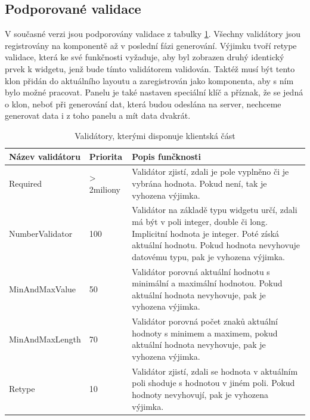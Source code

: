 \subsection{Podporované validace}
V současné verzi jsou podporovány validace z tabulky \ref{table:validations}. Všechny validátory jsou registrovány na komponentě až v poslední fázi generování. Výjimku tvoří retype validace, která ke své funkčnosti vyžaduje, aby byl zobrazen druhý identický prvek k widgetu, jenž bude tímto validátorem validován. Taktéž musí být tento klon přidán do aktuálního layoutu a zaregistrován jako komponenta, aby s ním bylo možné pracovat. Panelu je také nastaven speciální klíč a příznak, že se jedná o klon, neboť při generování dat, která budou odeslána na server, nechceme generovat data i z toho panelu a mít data dvakrát.
\begin{table}[width=\linewidth]
\begin{center}
\caption{Validátory, kterými disponuje klientská část}
\label{table:validations}
\begin{tabular}{|p{4cm}|p{2cm}|p{8cm}|}
\hline
\textbf{Název validátoru} & \textbf{Priorita} & \textbf{Popis funčknosti} \\
\hline
Required & > 2miliony & 
Validátor zjistí, zdali je pole vyplněno či je vybrána hodnota. Pokud není, tak je vyhozena výjimka. \\
\hline
NumberValidator & 100 &
Validátor na základě typu widgetu určí, zdali má být v poli integer, double či long. Implicitní hodnota je integer. Poté získá aktuální hodnotu. Pokud hodnota nevyhovuje datovému typu, pak je vyhozena výjimka. \\
\hline
MinAndMaxValue & 50 &
Validátor porovná aktuální hodnotu s minimální a maximální hodnotou. Pokud aktuální hodnota nevyhovuje, pak je vyhozena výjimka. \\
\hline
MinAndMaxLength & 70 &
Validátor porovná počet znaků aktuální hodnoty s minimem a maximem, pokud aktuální hodnota nevyhovuje, pak je vyhozena výjimka. \\
\hline
Retype & 10 &
Validátor zjistí, zdali se hodnota v aktuálním poli shoduje s hodnotou v jiném poli. Pokud hodnoty nevyhovují, pak je vyhozena výjimka. \\
\hline
\end{tabular}
\end{center}
\end{table}

